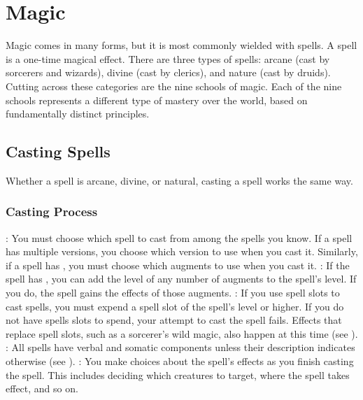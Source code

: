 \chapter{Magic}\label{Magic}

Magic comes in many forms, but it is most commonly wielded with spells. A spell is a one-time magical effect. There are three types of spells: arcane (cast by sorcerers and wizards), divine (cast by clerics), and nature (cast by druids). Cutting across these categories are the nine schools of magic. Each of the nine schools represents a different type of mastery over the world, based on fundamentally distinct principles.

\section{Casting Spells}\label{Casting Spells}
    Whether a spell is arcane, divine, or natural, casting a spell works the same way.

    \subsection{Casting Process}

        \begin{itemize}
            : You must choose which spell to cast from among the spells you know. If a spell has multiple versions, you choose which version to use when you cast it. Similarly, if a spell has , you must choose which augments to use when you cast it.
            : If the spell has , you can add the level of any number of augments to the spell's level. If you do, the spell gains the effects of those augments.
            : If you use spell slots to cast spells, you must expend a spell slot of the spell's level or higher. If you do not have spells slots to spend, your attempt to cast the spell fails. Effects that replace spell slots, such as a sorcerer's wild magic, also happen at this time (see ).
            : All spells have verbal and somatic components unless their description indicates otherwise (see ).
            : You make choices about the spell's effects as you finish casting the spell. This includes deciding which creatures to target, where the spell takes effect, and so on.
        \end{itemize}

